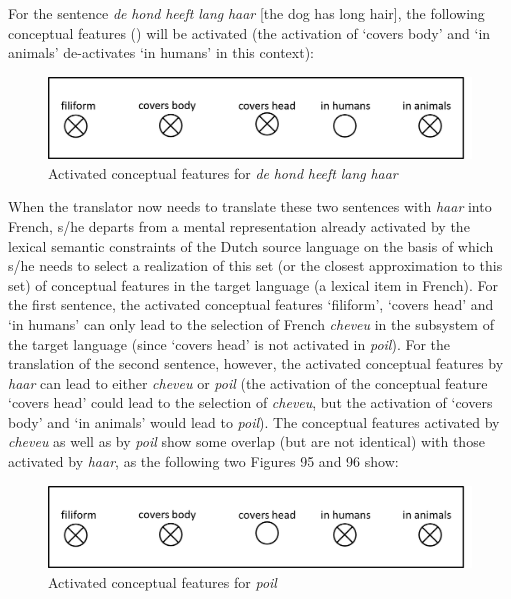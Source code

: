For the sentence \textit{de} \textit{hond} \textit{heeft} \textit{lang} \textit{haar} [the dog has long hair], the following conceptual features () will be activated (the activation of ‘covers body’ and ‘in animals’ de-activates ‘in humans’ in this context):

\begin{figure}
\includegraphics[height=.3\textheight]{figures/Vandevoorde2-img97.png}
\caption{\label{fig:key:94}  Activated conceptual features for \textit{de} \textit{hond} \textit{heeft} \textit{lang} \textit{haar}}
\end{figure}

When the translator now needs to translate these two sentences with \textit{haar} into French, s/he departs from a mental representation already activated by the lexical semantic constraints of the Dutch source language on the basis of which s/he needs to select a realization of this set (or the closest approximation to this set) of conceptual features in the target language (a lexical item in French). For the first sentence, the activated conceptual features ‘filiform’, ‘covers head’ and ‘in humans’ can only lead to the selection of French \textit{cheveu} in the subsystem of the target language (since ‘covers head’ is not activated in \textit{poil}). For the translation of the second sentence, however, the activated conceptual features by \textit{haar} can lead to either \textit{cheveu} or \textit{poil} (the activation of the conceptual feature ‘covers head’ could lead to the selection of \textit{cheveu}, but the activation of ‘covers body’ and ‘in animals’ would lead to \textit{poil}). The conceptual features activated by \textit{cheveu} as well as by \textit{poil} show some overlap (but are not identical) with those activated by \textit{haar}, as the following two Figures 95 and 96 show:

\begin{figure}
\includegraphics[height=.3\textheight]{figures/Vandevoorde2-img98.png}
\caption{\label{fig:key:95}  Activated conceptual features for \textit{poil}}
\end{figure}

